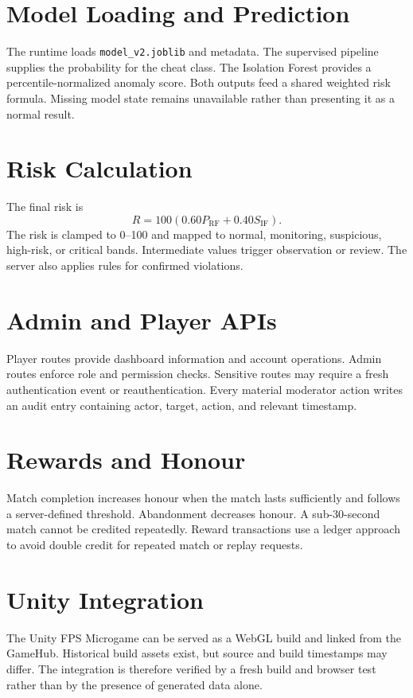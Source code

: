 \documentclass[12pt,a4paper,oneside]{report}
\begin{document}
\section{Model Loading and Prediction}
The runtime loads \texttt{model\_v2.joblib} and metadata. The supervised pipeline supplies the probability for the cheat class. The Isolation Forest provides a percentile-normalized anomaly score. Both outputs feed a shared weighted risk formula. Missing model state remains unavailable rather than presenting it as a normal result.

\section{Risk Calculation}
The final risk is
\[
R=100(0.60P_{\mathrm{RF}}+0.40S_{\mathrm{IF}}).
\]
The risk is clamped to 0--100 and mapped to normal, monitoring, suspicious, high-risk, or critical bands. Intermediate values trigger observation or review. The server also applies rules for confirmed violations.

\section{Admin and Player APIs}
Player routes provide dashboard information and account operations. Admin routes enforce role and permission checks. Sensitive routes may require a fresh authentication event or reauthentication. Every material moderator action writes an audit entry containing actor, target, action, and relevant timestamp.

\section{Rewards and Honour}
Match completion increases honour when the match lasts sufficiently and follows a server-defined threshold. Abandonment decreases honour. A sub-30-second match cannot be credited repeatedly. Reward transactions use a ledger approach to avoid double credit for repeated match or replay requests.

\section{Unity Integration}
The Unity FPS Microgame can be served as a WebGL build and linked from the GameHub. Historical build assets exist, but source and build timestamps may differ. The integration is therefore verified by a fresh build and browser test rather than by the presence of generated data alone.
\end{document}
